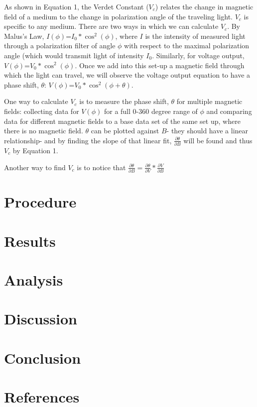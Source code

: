 \documentclass[prb,preprint]{revtex4-1}
\begin{document}
{As shown in Equation 1, the Verdet Constant ($V_{c}$) relates the change in magnetic field of a medium to the change in polarization angle of the traveling light.  $V_{c}$ is specific to any medium.  There are two ways in which we can calculate $V_{c}$.  By Malus's Law, $I(\phi)$=$I_{0}*\cos^{2}(\phi)$, where $I$ is the intensity of measured light through a polarization filter of angle $\phi$ with respect to the maximal polarization angle (which would transmit light of intensity $I_{0}$.  Similarly, for voltage output, $V(\phi)$=$V_{0}*\cos^{2}(\phi)$.  Once we add into this set-up a magnetic field through which the light can travel, we will observe the voltage output equation to have a phase shift, $\theta$:  $V(\phi)$=$V_{0}*\cos^{2}(\phi+\theta)$.}

{One way to calculate $V_{c}$ is to measure the phase shift, $\theta$ for multiple magnetic fields:  collecting data for $V(\phi)$ for a full 0-360 degree range of $\phi$ and comparing data for different magnetic fields to a base data set of the same set up, where there is no magnetic field.  $\theta$ can be plotted against $B$- they should have a linear relationship- and by finding the slope of that linear fit, $\frac{\partial \theta}{\partial B}$ will be found and thus $V_{c}$ by Equation 1.}

{Another way to find $V_{c}$ is to notice that $\frac{\partial \theta}{\partial B}= \frac{\partial \theta}{\partial V}*\frac{\partial V}{\partial B}$}


\section{Procedure}



\section{Results}


\section{Analysis}


\section{Discussion}




\section{Conclusion}


\section{References}
\end{document}
